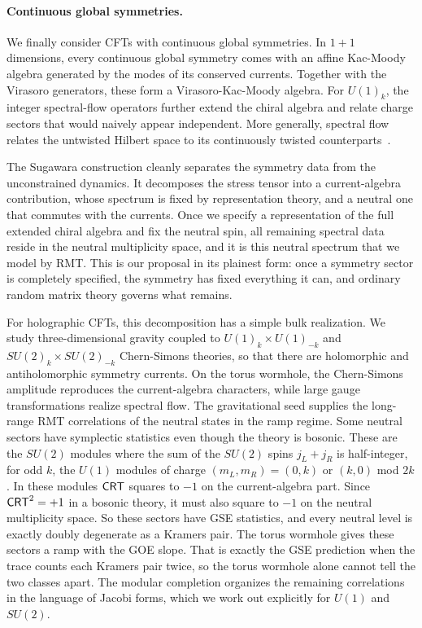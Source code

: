 \documentclass[11pt]{article}
\numberwithin{equation}{section}
\begin{document}
\vspace{-.2cm}
\paragraph{Continuous global symmetries.}

We finally consider CFTs with continuous global symmetries. In $1+1$ dimensions, every continuous global symmetry comes with an affine Kac-Moody algebra generated by the modes of its conserved currents. Together with the Virasoro generators, these form a Virasoro-Kac-Moody algebra. For $U(1)_k$, the integer spectral-flow operators further extend the chiral algebra and relate charge sectors that would naively appear independent. More generally, spectral flow relates the untwisted Hilbert space to its continuously twisted counterparts~\cite{Schwimmer:1986mf,Benjamin:2020swg}.

The Sugawara construction cleanly separates the symmetry data from the unconstrained dynamics. It decomposes the stress tensor into a current-algebra contribution, whose spectrum is fixed by representation theory, and a neutral one that commutes with the currents. Once we specify a representation of the full extended chiral algebra and fix the neutral spin, all remaining spectral data reside in the neutral multiplicity space, and it is this neutral spectrum that we model by RMT. This is our proposal in its plainest form: once a symmetry sector is completely specified, the symmetry has fixed everything it can, and ordinary random matrix theory governs what remains.

For holographic CFTs, this decomposition has a simple bulk realization. We study three-dimensional gravity coupled to $U(1)_k\times U(1)_{-k}$ and $SU(2)_k\times SU(2)_{-k}$ Chern-Simons theories, so that there are holomorphic and antiholomorphic symmetry currents. On the torus wormhole, the Chern-Simons amplitude reproduces the current-algebra characters, while large gauge transformations realize spectral flow. The gravitational seed supplies the long-range RMT correlations of the neutral states in the ramp regime. Some neutral sectors have symplectic statistics even though the theory is bosonic. These are the $SU(2)$ modules where the sum of the $SU(2)$ spins $j_L+j_R$ is half-integer, for odd $k$, the $U(1)$ modules of charge $(m_L,m_R)=(0,k)$ or $(k,0)$ mod $2k$. In these modules $\mathsf{CRT}$ squares to $-1$ on the current-algebra part. Since $\mathsf{CRT}^2=+1$ in a bosonic theory, it must also square to $-1$ on the neutral multiplicity space. So these sectors have GSE statistics, and every neutral level is exactly doubly degenerate as a Kramers pair. The torus wormhole gives these sectors a ramp with the GOE slope. That is exactly the GSE prediction when the trace counts each Kramers pair twice, so the torus wormhole alone cannot tell the two classes apart. The modular completion organizes the remaining correlations in the language of Jacobi forms, which we work out explicitly for $U(1)$ and $SU(2)$.
\end{document}
